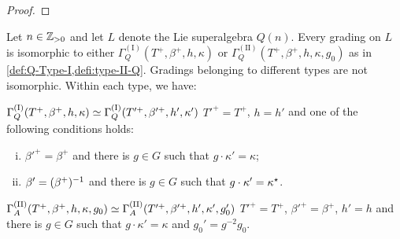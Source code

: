 \begin{proof}
\end{proof}



\begin{thm}\label{thm:final-Q(n)}
    Let $n \in \mathbb{Z}_{> 0}$ and 
    let $L$ denote the Lie superalgebra $Q(n)$. 
    Every grading on $L$ is isomorphic to either $\Gamma_Q^{\mathrm{(I)}}(T^+, \beta^+, h, \kappa)$ or $\Gamma_Q^{\mathrm{(II)}}(T^+, \beta^+, h, \kappa, g_0)$ as in \cref{def:Q-Type-I,defi:type-II-Q}. 
    Gradings belonging to different types are not isomorphic. 
    Within each type, we have:
    
    \noindent{}
    
    \noindent $\Gamma_Q^{\mathrm{(I)}}(T^+, \beta^+, h, \kappa) \simeq \Gamma_Q^{\mathrm{(I)}}(T'^+, \beta'^+, h', \kappa')$ \IFF  $T'^+ = T^+$, $h = h'$ and one of the following conditions holds:
	\begin{enumerate}[(i)]
	    \item $\beta'^+ = \beta^+$ and there is $g\in G$ such that $g \cdot \kappa'=\kappa$; 
	    \item $\beta'= (\beta^+)^{-1}$ and there is $g\in G$ such that $g \cdot \kappa'= \kappa^\star$.
	\end{enumerate}

    \noindent{}
    
    \noindent $\Gamma_A^{\mathrm{(II)}}(T^+, \beta^+, h, \kappa, g_0) \simeq \Gamma_A^{\mathrm{(II)}}(T'^+, \beta'^+, h', \kappa', g_0')$ \IFF
    $T'^+ =T^+$, $\beta'^+ = \beta^+$, $h' = h$ and there is $g \in G$ such that $g\cdot\kappa' = \kappa$ and $g_0' = g^{-2}g_0$. 
\end{thm}

